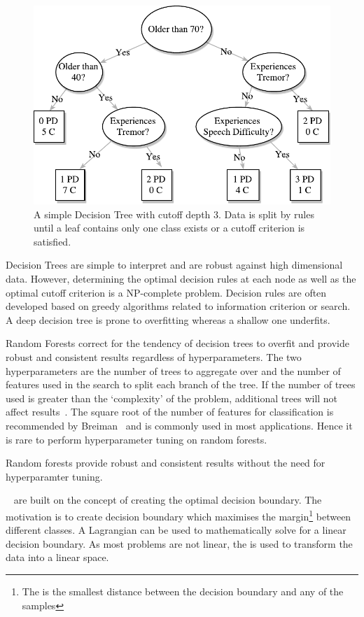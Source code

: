 \documentclass[12pt, twoside]{book}
\renewcommand\emph[1]{\textit{\color{USred}{#1}}}
\begin{document}
\begin{figure}[h]
\label{decisiontree}
\centering\includegraphics[width=0.8\linewidth]{decisiontree.pdf}
\caption{A simple Decision Tree with cutoff depth 3. Data is split by rules until a leaf contains only one class exists or a cutoff criterion is satisfied.}
\end{figure}

Decision Trees are simple to interpret and are robust against high dimensional data. However, determining the optimal decision rules at each node as well as the optimal cutoff criterion is a NP-complete problem. Decision rules are often developed based on greedy algorithms related to information criterion or search. A deep decision tree is prone to overfitting whereas a shallow one underfits.

Random Forests correct for the tendency of decision trees to overfit and provide robust and consistent results regardless of hyperparameters. The two hyperparameters are the number of trees to aggregate over and the number of features used in the search to split each branch of the tree. If the number of trees used is greater than the `complexity' of the problem, additional trees will not affect results~\cite{treesinaforest}. The square root of the number of features for classification is recommended by Breiman~\cite{randomforests} and is commonly used in most applications. Hence it is rare to perform hyperparameter tuning on random forests.

\begin{highlight}
Random forests provide robust and consistent results without the need for hyperparamter tuning.
\end{highlight}

\emph{Support Vector Machines}~\cite{svm} are built on the concept of creating the optimal decision boundary. The motivation is to create decision boundary which maximises the margin\footnote{The \emph{margin} is the smallest distance between the decision boundary and any of the samples} between different classes. A Lagrangian can be used to mathematically solve for a linear decision boundary. As most problems are not linear, the \emph{kernel trick} is used to transform the data into a linear space.
\end{document}
